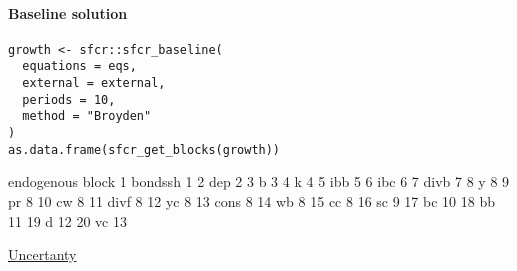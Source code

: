 \documentclass[11pt]{article}
\begin{document}
\paragraph*{Baseline solution}
\label{sec:org3f3f947}

\begin{verbatim}
growth <- sfcr::sfcr_baseline(
  equations = eqs,
  external = external,
  periods = 10,
  method = "Broyden"
)
as.data.frame(sfcr_get_blocks(growth))
\end{verbatim}

   endogenous block
1     bondssh     1
2         dep     2
3           b     3
4           k     4
5         ibb     5
6         ibc     6
7        divb     7
8           y     8
9          pr     8
10         cw     8
11       divf     8
12         yc     8
13       cons     8
14         wb     8
15         cc     8
16         sc     9
17         bc    10
18         bb    11
19          d    12
20         vc    13

\href{uncertanty.org}{Uncertanty}
\end{document}
